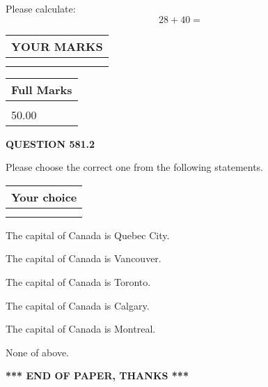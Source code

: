 \documentclass[12pt]{article}
\begin{document}
  
 
Please calculate:
\begin{equation}
28 +  %
40 = \nonumber
\end{equation}
 

 

 
  
\vspace{0.2in}
  
\noindent\begin{tabular}{|l|}
\hline
 YOUR MARKS  \\
\hline
 \\ 
 \\ 
\hline
\end{tabular}
\hspace{0.05in} \begin{tabular}{|l|}
\hline
 Full Marks  \\
\hline
 \\ 
50.00 \\
\hline
\end{tabular}
{\textbf{\Large{QUESTION
581.2 
}}}
  
  
Please choose the correct one from the following statements.
  
  
\noindent\hspace{3.0in} \begin{tabular}{|l|}
\hline
Your choice \\
\hline
 \\ 
 \\ 
\hline
\end{tabular}
  
  
 
 
The capital of Canada is Quebec City.
 
 
The capital of Canada is Vancouver.
 
 
The capital of Canada is Toronto.
 
 
The capital of Canada is Calgary.
 
 
The capital of Canada is Montreal.
 
 
 None of above.
 
 
   
   
 \vspace{0.2in}
 
   
   
   
   
\vspace{1.0in} 
{\textbf{\large{ *** END OF PAPER, THANKS *** }}} 
   
\end{document}
